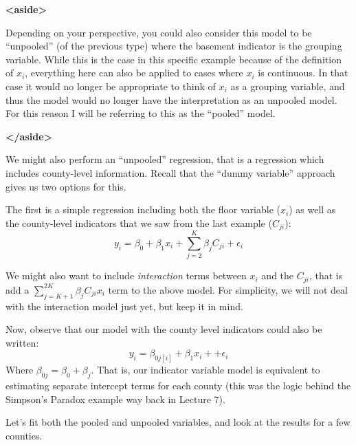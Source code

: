 \documentclass[
]{article}
\begin{document}
\textbf{\textless aside\textgreater{}}

Depending on your perspective, you could also consider this model to be
``unpooled'' (of the previous type) where the basement indicator is the
grouping variable. While this is the case in this specific example
because of the definition of \(x_i\), everything here can also be
applied to cases where \(x_i\) is continuous. In that case it would no
longer be appropriate to think of \(x_i\) as a grouping variable, and
thus the model would no longer have the interpretation as an unpooled
model. For this reason I will be referring to this as the ``pooled''
model.

\textbf{\textless/aside\textgreater{}}

We might also perform an ``unpooled'' regression, that is a regression
which includes county-level information. Recall that the ``dummy
variable'' approach gives us two options for this.

The first is a simple regression including both the floor variable
(\(x_i\)) as well as the county-level indicators that we saw from the
last example (\(C_{ji}\)): \[
y_i = \beta_0 + \beta_1 x_i + \sum_{j=2}^K \beta_j C_{ji} + \epsilon_i 
\]

We might also want to include \emph{interaction} terms between \(x_i\)
and the \(C_{ji}\), that is add a
\(\sum_{j=K+1}^{2K} \beta_j C_{ji} x_i\) term to the above model. For
simplicity, we will not deal with the interaction model just yet, but
keep it in mind.

Now, observe that our model with the county level indicators could also
be written: \[
y_i = \beta_{0j[i]} + \beta_1 x_i + + \epsilon_i 
\] Where \(\beta_{0j} = \beta_0 + \beta_j\). That is, our indicator
variable model is equivalent to estimating separate intercept terms for
each county (this was the logic behind the Simpson's Paradox example way
back in Lecture 7).

Let's fit both the pooled and unpooled variables, and look at the
results for a few counties.
\end{document}
